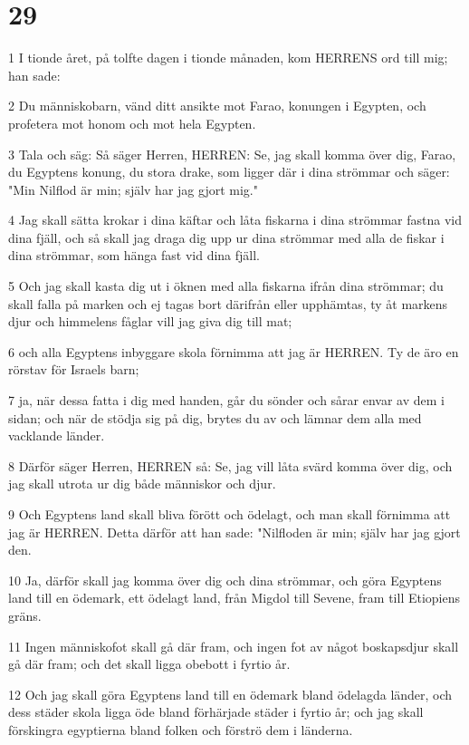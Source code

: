 \chapter{29}

\par 1 I tionde året, på tolfte dagen i tionde månaden, kom HERRENS ord till mig; han sade:
\par 2 Du människobarn, vänd ditt ansikte mot Farao, konungen i Egypten, och profetera mot honom och mot hela Egypten.
\par 3 Tala och säg: Så säger Herren, HERREN: Se, jag skall komma över dig, Farao, du Egyptens konung, du stora drake, som ligger där i dina strömmar och säger: "Min Nilflod är min; själv har jag gjort mig."
\par 4 Jag skall sätta krokar i dina käftar och låta fiskarna i dina strömmar fastna vid dina fjäll, och så skall jag draga dig upp ur dina strömmar med alla de fiskar i dina strömmar, som hänga fast vid dina fjäll.
\par 5 Och jag skall kasta dig ut i öknen med alla fiskarna ifrån dina strömmar; du skall falla på marken och ej tagas bort därifrån eller upphämtas, ty åt markens djur och himmelens fåglar vill jag giva dig till mat;
\par 6 och alla Egyptens inbyggare skola förnimma att jag är HERREN. Ty de äro en rörstav för Israels barn;
\par 7 ja, när dessa fatta i dig med handen, går du sönder och sårar envar av dem i sidan; och när de stödja sig på dig, brytes du av och lämnar dem alla med vacklande länder.
\par 8 Därför säger Herren, HERREN så: Se, jag vill låta svärd komma över dig, och jag skall utrota ur dig både människor och djur.
\par 9 Och Egyptens land skall bliva förött och ödelagt, och man skall förnimma att jag är HERREN. Detta därför att han sade: "Nilfloden är min; själv har jag gjort den.
\par 10 Ja, därför skall jag komma över dig och dina strömmar, och göra Egyptens land till en ödemark, ett ödelagt land, från Migdol till Sevene, fram till Etiopiens gräns.
\par 11 Ingen människofot skall gå där fram, och ingen fot av något boskapsdjur skall gå där fram; och det skall ligga obebott i fyrtio år.
\par 12 Och jag skall göra Egyptens land till en ödemark bland ödelagda länder, och dess städer skola ligga öde bland förhärjade städer i fyrtio år; och jag skall förskingra egyptierna bland folken och förströ dem i länderna.
